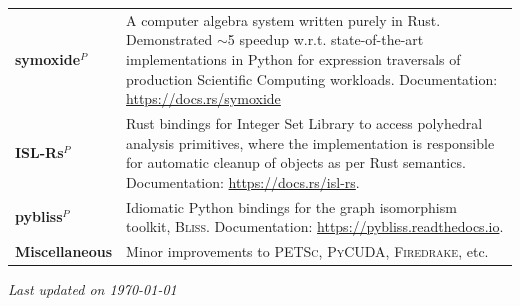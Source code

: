 \documentclass[letterpaper, 13pt]{article}
\newcommand{\updatenote}[1][\today]{\par\vfill{\scriptsize \textit{Last updated on #1}}}
\begin{document}
\begin{tabular}{p{} p{}}
  \textbf{symoxide}$^P$ &
  A computer algebra system written purely in Rust. Demonstrated $\sim$5
  speedup w.r.t. state-of-the-art implementations in Python for expression
  traversals of production Scientific Computing workloads.  Documentation:
  \url{https://docs.rs/symoxide}
    \vspace{1ex}\\

  \textbf{ISL-Rs}$^P$ &
  Rust bindings for Integer Set Library to access polyhedral analysis
  primitives, where the implementation is responsible for automatic cleanup of
  objects as per Rust semantics. Documentation: \url{https://docs.rs/isl-rs}.
  \vspace{1ex}\\

  \textbf{pybliss}$^P$ &
  Idiomatic Python bindings for the graph isomorphism toolkit, \textsc{Bliss}.
  Documentation: \url{https://pybliss.readthedocs.io}.
  \vspace{1ex}\\

  \textbf{Miscellaneous} &
    Minor improvements to \textsc{PETSc}, \textsc{PyCUDA}, \textsc{Firedrake}, etc.\\
\end{tabular}


\updatenote{}
\end{document}
